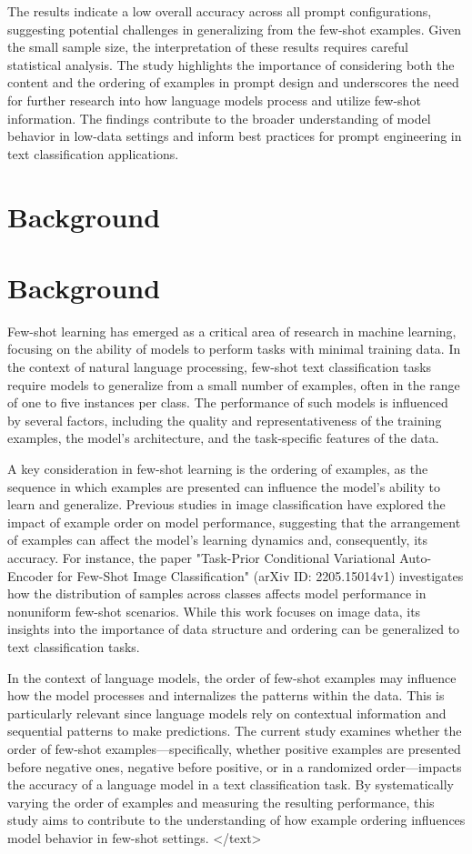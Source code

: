\documentclass{article}
\begin{document}
The results indicate a low overall accuracy across all prompt configurations, suggesting potential challenges in generalizing from the few-shot examples. Given the small sample size, the interpretation of these results requires careful statistical analysis. The study highlights the importance of considering both the content and the ordering of examples in prompt design and underscores the need for further research into how language models process and utilize few-shot information. The findings contribute to the broader understanding of model behavior in low-data settings and inform best practices for prompt engineering in text classification applications.
\section{Background}
\section*{Background}

Few-shot learning has emerged as a critical area of research in machine learning, focusing on the ability of models to perform tasks with minimal training data. In the context of natural language processing, few-shot text classification tasks require models to generalize from a small number of examples, often in the range of one to five instances per class. The performance of such models is influenced by several factors, including the quality and representativeness of the training examples, the model's architecture, and the task-specific features of the data. 

A key consideration in few-shot learning is the ordering of examples, as the sequence in which examples are presented can influence the model's ability to learn and generalize. Previous studies in image classification have explored the impact of example order on model performance, suggesting that the arrangement of examples can affect the model's learning dynamics and, consequently, its accuracy. For instance, the paper "Task-Prior Conditional Variational Auto-Encoder for Few-Shot Image Classification" (arXiv ID: 2205.15014v1) investigates how the distribution of samples across classes affects model performance in nonuniform few-shot scenarios. While this work focuses on image data, its insights into the importance of data structure and ordering can be generalized to text classification tasks.

In the context of language models, the order of few-shot examples may influence how the model processes and internalizes the patterns within the data. This is particularly relevant since language models rely on contextual information and sequential patterns to make predictions. The current study examines whether the order of few-shot examples—specifically, whether positive examples are presented before negative ones, negative before positive, or in a randomized order—impacts the accuracy of a language model in a text classification task. By systematically varying the order of examples and measuring the resulting performance, this study aims to contribute to the understanding of how example ordering influences model behavior in few-shot settings.
</text>
\end{document}
